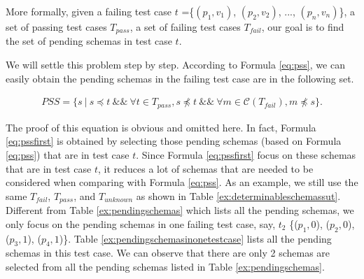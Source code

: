 
More formally,  given a failing test case $t$ =\{$(p_{1}, v_{1})$, $(p_{2}, v_{2})$, ..., $(p_{n}, v_{n})$\},  a set of passing test cases $T_{pass}$, a set of failing test cases $T_{fail}$, our goal is to find the set of pending schemas in test case $t$.


We will settle this problem step by step.  According to Formula \ref{eq:pss}, we can easily obtain the pending schemas in the failing test case are in the following set.


\begin{equation}
\begin{aligned}\label{eq:pssfirst}
PSS=\{ s\ |\ s \preceq t\ \&\&\ \forall t \in T_{pass},  s \npreceq t  \ \&\& \  \forall m \in \mathcal{C}(T_{fail}), m \npreceq s \}.
\end{aligned}
\end{equation}

The proof of this equation is obvious and omitted here. In fact, Formula \ref{eq:pssfirst} is obtained by selecting those pending schemas (based on Formula \ref{eq:pss}) that are in test case $t$.  Since Formula \ref{eq:pssfirst} focus on these schemas that are in test case $t$, it reduces a lot of schemas that are needed to be considered when comparing with Formula \ref{eq:pss}. As an example, we still use the same  $T_{fail}$, $T_{pass}$, and $T_{unknown}$ as shown in Table \ref{ex:determinableschemassut}. Different from Table \ref{ex:pendingschemas} which lists all the pending schemas, we only focus on the pending schemas in one failing test case, say, $t_{2}$ \{($p_{1}, 0$), ($p_{2}, 0$), ($p_{3}, 1$), ($p_{4}, 1$)\}. Table \ref{ex:pendingschemasinonetestcase} lists all the pending schemas in this test case. We can observe that there are only 2 schemas are selected from all the pending schemas listed in Table \ref{ex:pendingschemas}.

